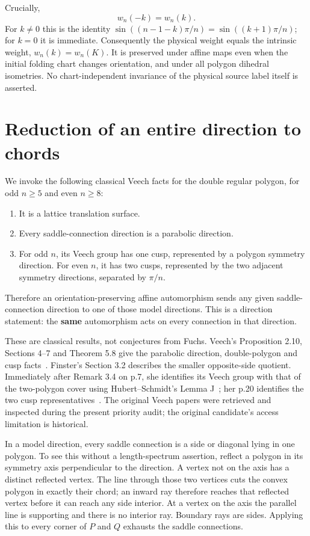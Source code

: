 \documentclass[11pt]{article}
\begin{document}
Crucially,
\[
w_n(-k)=w_n(k).
\tag{10}
\]
For \(k\ne0\) this is the identity
\(\sin((n-1-k)\pi/n)=\sin((k+1)\pi/n)\); for \(k=0\) it is immediate. Consequently the physical weight equals the intrinsic weight, \(w_n(k)=w_n(K)\). It is preserved under affine maps even when the initial folding chart changes orientation, and under all polygon dihedral isometries. No chart-independent invariance of the physical source label itself is asserted.

\section{Reduction of an entire direction to chords}

We invoke the following classical Veech facts for the double regular polygon, for odd \(n\ge5\) and even \(n\ge8\):

\begin{enumerate}
\item It is a lattice translation surface.
\item Every saddle-connection direction is a parabolic direction.
\item For odd \(n\), its Veech group has one cusp, represented by a polygon symmetry direction. For even \(n\), it has two cusps, represented by the two adjacent symmetry directions, separated by \(\pi/n\).

\end{enumerate}
Therefore an orientation-preserving affine automorphism sends any given saddle-connection direction to one of those model directions. This is a direction statement: the \textbf{same} automorphism acts on every connection in that direction.

These are classical results, not conjectures from Fuchs. Veech's Proposition 2.10, Sections 4--7 and Theorem 5.8 give the parabolic direction, double-polygon and cusp facts~\cite{Veech}. Finster's Section 3.2 describes the smaller opposite-side quotient. Immediately after Remark 3.4 on p.7, she identifies its Veech group with that of the two-polygon cover using Hubert--Schmidt's Lemma J~\cite{HubertSchmidt}; her p.20 identifies the two cusp representatives~\cite{Finster}. The original Veech papers were retrieved and inspected during the present priority audit; the original candidate's access limitation is historical.

In a model direction, every saddle connection is a side or diagonal lying in one polygon. To see this without a length-spectrum assertion, reflect a polygon in its symmetry axis perpendicular to the direction. A vertex not on the axis has a distinct reflected vertex. The line through those two vertices cuts the convex polygon in exactly their chord; an inward ray therefore reaches that reflected vertex before it can reach any side interior. At a vertex on the axis the parallel line is supporting and there is no interior ray. Boundary rays are sides. Applying this to every corner of \(P\) and \(Q\) exhausts the saddle connections.
\end{document}
